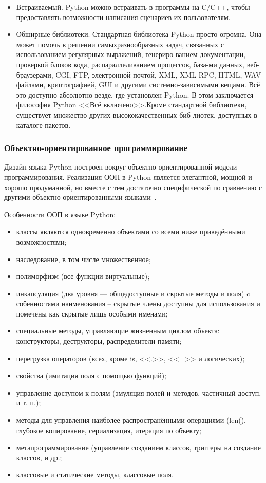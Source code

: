 \begin{itemize}
  \item Встраиваемый. Python можно встраивать в программы на C/C++, чтобы предоставлять возможности написания сценариев их пользователям.
  \item Обширные библиотеки. Стандартная библиотека Python просто огромна. Она может помочь в решении самыхразнообразных задач, связанных с использованием регулярных выражений, генериро-ванием документации, проверкой блоков кода, распараллеливанием процессов, база-ми данных, веб-браузерами, CGI, FTP, электронной почтой, XML, XML-RPC, HTML, WAV файлами, криптографией, GUI и другими системно-зависимыми вещами. Всё это доступно абсолютно везде, где установлен Python. В этом заключается философия Python <<Всё включено>>.Кроме стандартной библиотеки, существует множество других высококачественных биб-лиотек, доступных в каталоге пакетов.
\end{itemize}

\subsubsection{Объектно-ориентированное программирование}
Дизайн языка Python построен вокруг объектно-ориентированной модели программирования. Реализация ООП в Python является элегантной, мощной и хорошо продуманной, но вместе с тем достаточно специфической по сравнению с другими объектно-ориентированными языками~\cite{wiki_python, byte_of_python}.

Особенности ООП в языке Python:
\begin{itemize}
\item классы являются одновременно объектами со всеми ниже приведёнными возможностями;
\item наследование, в том числе множественное;
\item полиморфизм (все функции виртуальные);
\item инкапсуляция (два уровня — общедоступные и скрытые методы и поля) c собенностями наименования -- скрытые члены доступны для использования и помечены как скрытые лишь особыми именами;
\item специальные методы, управляющие жизненным циклом объекта: конструкторы, деструкторы, распределители памяти;
\item перегрузка операторов (всех, кроме is, <<.>>, <<=>> и логических);
\item свойства (имитация поля с помощью функций);
\item управление доступом к полям (эмуляция полей и методов, частичный доступ, и т. п.);
\item методы для управления наиболее распространёнными операциями (len(), глубокое копирование, сериализация, итерация по объекту;
\item метапрограммирование (управление созданием классов, триггеры на создание классов, и др.;
\item классовые и статические методы, классовые поля.
\end{itemize}

